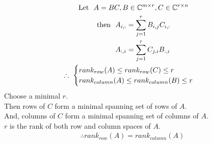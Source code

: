 \documentclass{mathtoolkit}
\begin{document}
\begin{p}
\begin{subp}
      \item
        \begin{gather*}
          \text{Let}\ A = BC, B \in \field{C}^{m \times r}, C \in \field{C}^{r \times n} \\
          \begin{aligned}
            \text{then}\
            & A_{i, :} = \sum_{j=1}^r B_{i, j} C_{i, :} \\
            & A_{:, i} = \sum_{j=1}^r C_{j, i} B_{:, i}
          \end{aligned} \\
          \therefore \begin{cases}
            rank_{row}(A) \le rank_{row}(C) \le r \\
            rank_{column}(A) \le rank_{column}(B) \le r
          \end{cases}
        \end{gather*}
        Choose a minimal $r$. \\
        Then rows of $C$ form a minimal spanning set of rows of $A$. \\
        And, columns of $C$ form a minimal spanning set of columns of $A$. \\
        \therefore $r$ is the rank of both row and column spaces of $A$. \\
        \begin{gather*}
          \therefore rank_{row}(A) = rank_{column}(A)
        \end{gather*}
    \end{subp}
\end{p}
\end{document}
